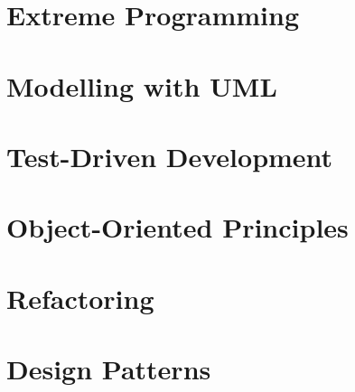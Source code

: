 \documentclass[]{UCD_CS_FYP_Report}
\begin{document}
\maketitle

\tableofcontents{}\newpage
\newpage

\chapter{Extreme Programming}


\chapter{Modelling with UML}


\chapter{Test-Driven Development}


\chapter{Object-Oriented Principles}


\chapter{Refactoring}


\chapter{Design Patterns}


% 

\newpage


\label{endpage}
\end{document}
